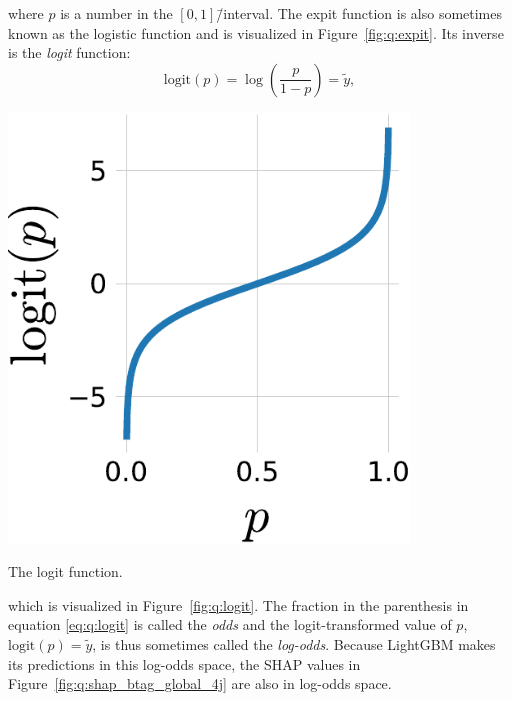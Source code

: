 \noindent where $p$ is a number in the $[0, 1]$\=/interval. The expit function is also sometimes known as the logistic function and is visualized in Figure~\ref{fig:q:expit}. Its inverse is the \emph{logit} function:
\begin{equation}
  \label{eq:q:logit}
  \mathrm{logit}(p) = \log \left( \frac{p}{1-p}  \right) = \tilde{y},
\end{equation}

 \begin{marginfigure}
  \centerfloat
  \includegraphics[width=0.8\textwidth]{figures/logit_expit/logit.pdf}
  \caption[The Logit Function]
          {The logit function.} 
  \label{fig:q:logit}
\end{marginfigure}

 \noindent which is visualized in Figure~\ref{fig:q:logit}. The fraction in the parenthesis in equation \eqref{eq:q:logit} is called the \emph{odds} and the logit-transformed value of $p$, $\mathrm{logit}(p)=\tilde{y}$, is thus sometimes called the \emph{log-odds}. Because LightGBM makes its predictions in this log-odds space, the SHAP values in Figure~\ref{fig:q:shap_btag_global_4j} are also in log-odds space. 

